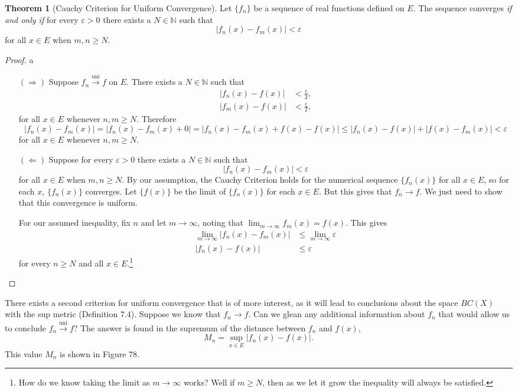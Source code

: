 \documentclass{article}
\newcommand{\N}{\mathbb{N}}
\newcommand{\uni}{\overset{\text{uni}}{\to}}
\theoremstyle{definition}
\newtheorem{theorem}{Theorem}[section]
\begin{document}
\begin{theorem}[Cauchy Criterion for Uniform Convergence]
	Let $ \{f_n\} $ be a sequence of real functions defined on $ E $. The sequence converges \textit{if and only if} for every $ \varepsilon>0 $ there exists a $ N\in \N $ such that
	$$|f_n(x)-f_m(x)|<\varepsilon $$ for all $ x\in E $ when $ m,n\ge N $. 
\end{theorem}
\begin{proof}{\color{white}a}
	\begin{enumerate}
		\item [$ (\Longrightarrow) $] Suppose $ f_n\uni f $ on $ E $. There exists a $ N\in\N $ such that \begin{align*}
			|f_n(x)-f(x)|&<\frac{\varepsilon}{2},\\
			|f_m(x)-f(x)|&<\frac{\varepsilon}{2},
		\end{align*}
		for all $ x\in E $ whenever $ n,m\ge N $. Therefore $$|f_n(x)-f_m(x)|=|f_n(x)-f_m(x)+0|=|f_n(x)-f_m(x)+f(x)-f(x)|\le |f_n(x)-f(x)|+|f(x)-f_m(x)|<\varepsilon $$ for all $ x\in E $ whenever $ n,m\ge N $. 
		\item [$ (\Longleftarrow) $]  Suppose for every $ \varepsilon>0 $ there exists a $ N\in \N $ such that
		$$|f_n(x)-f_m(x)|<\varepsilon $$ for all $ x\in E $ when $ m,n\ge N $. By our assumption, the Cauchy Criterion holds for the numerical sequence $ \{f_n(x)\} $ for all $ x\in E $, so for each $ x $, $ \{f_n(x)\} $ converges. Let $ \{f(x)\} $ be the limit of $ \{f_n(x)\} $ for each $ x\in E $. But this gives that $ f_n\to f $. We just need to show that this convergence is uniform. 
		
		For our assumed inequality, fix $ n $ and let $ m\to \infty $, noting that $ \lim_{m\to \infty}f_m(x)=f(x) $. This gives 
		\begin{align*}
			\lim_{m\to\infty}|f_n(x)-f_m(x)|&\le \lim_{m\to\infty}\varepsilon\\
		 	|f_n(x)-f(x)|&\le \varepsilon
		\end{align*}
		for every $ n\ge N $ and all $ x\in E $.\footnote{How do we know taking the limit as $ m\to\infty $ works? Well if $ m\ge N $, then as we let it grow the inequality will always be satisfied. }
	\end{enumerate}
\end{proof}
There exists a second criterion for uniform convergence that is of more interest, as it will lead to conclusions about the space $ BC(X) $ with the sup metric (Definition 7.4). Suppose we know that $ f_n\to f $. Can we glean any additional information about $ f_n $ that would allow us to conclude $ f_n\uni f $? The answer is found in the supremum of the distance between $ f_n $ and $ f(x) $, $$M_n=\sup_{x\in E}|f_n(x)-f(x)| .$$ This value $ M_n $ is shown in Figure 78. 
\end{document}
